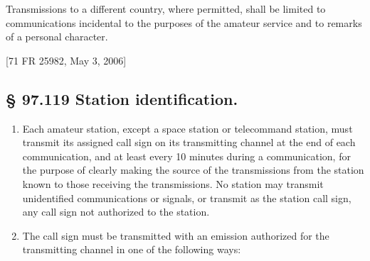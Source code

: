 \documentclass[
  letterpaper,
  DIV=11,
  numbers=noendperiod]{scrreport}
\begin{document}
Transmissions to a different country, where permitted, shall be limited
to communications incidental to the purposes of the amateur service and
to remarks of a personal character.

{[}71 FR 25982, May 3, 2006{]}

\hypertarget{97.119}{%
\subsection*{§ 97.119 Station identification.}\label{97.119}}

\begin{enumerate}
\def\labelenumi{(\alph{enumi})}
\item
  Each amateur station, except a space station or telecommand station,
  must transmit its assigned call sign on its transmitting channel at
  the end of each communication, and at least every 10 minutes during a
  communication, for the purpose of clearly making the source of the
  transmissions from the station known to those receiving the
  transmissions. No station may transmit unidentified communications or
  signals, or transmit as the station call sign, any call sign not
  authorized to the station.
\item
  The call sign must be transmitted with an emission authorized for the
  transmitting channel in one of the following ways:
\end{enumerate}
\end{document}
